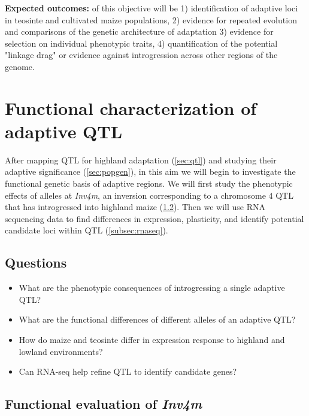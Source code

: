 {\bf Expected outcomes:}  of this objective will be 1) identification of adaptive loci in teosinte and cultivated maize populations, 2) evidence for repeated evolution and comparisons of the genetic architecture of adaptation 3) evidence for selection on individual phenotypic traits, 4) quantification of the potential "linkage drag" or evidence against introgression across other regions of the genome.

\section{Functional characterization of adaptive QTL} \label{sec:funchar}

After mapping QTL for highland adaptation (\ref{sec:qtl}) and studying their adaptive significance (\ref{sec:popgen}), in this aim we will begin to investigate the functional genetic basis of adaptive regions.  We will first study the phenotypic effects of alleles at \emph{Inv4m}, an inversion corresponding to a chromosome 4 QTL that has introgressed into highland maize  (\ref{subsec:nils}).  Then we will use RNA sequencing data to find differences in expression, plasticity, and identify potential candidate loci within QTL (\ref{subsec:rnaseq}).

\subsection{Questions}
\begin{itemize}[topsep=0pt,itemsep=-1ex,partopsep=1ex,parsep=1ex]
\item What are the phenotypic consequences of introgressing a single adaptive QTL?
\item What are the functional differences of different alleles of an adaptive QTL?
\item How do maize and teosinte differ in expression response to highland and lowland environments?
\item Can RNA-seq help refine QTL to identify candidate genes?
\end{itemize}

\subsection{Functional evaluation of \emph{Inv4m}} \label{subsec:nils}

